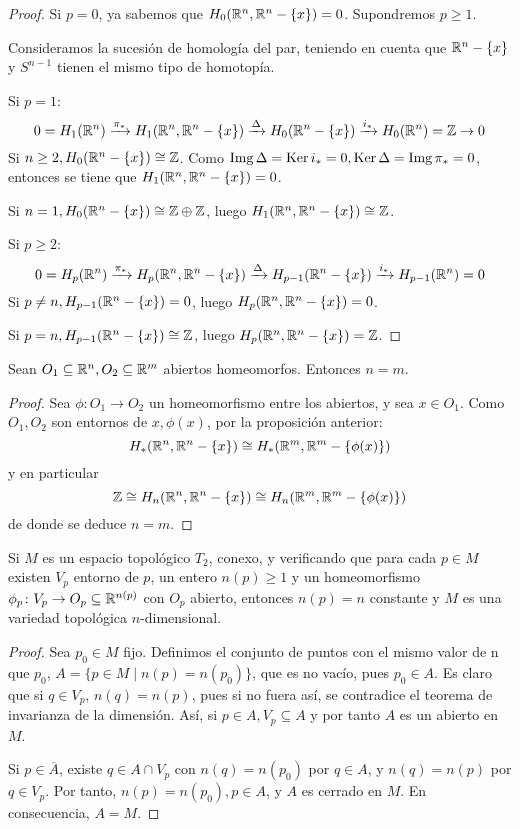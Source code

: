 \begin{proof}
  Si $p = 0$, ya sabemos que $H_0(\mathbb{R}^n, \mathbb{R}^n - \{x\}) = 0$. Supondremos $p \geq 1$.

  Consideramos la sucesión de homología del par, teniendo en cuenta que $\mathbb{R}^n - \{x\}$ y $S^{n-1}$ tienen el mismo tipo de homotopía.

  Si $p = 1$:
  \[ 0 = H_1(\mathbb{R}^n) \xrightarrow{\pi_*} H_1(\mathbb{R}^n, \mathbb{R}^n - \{x\}) \xrightarrow{\Delta} H_0(\mathbb{R}^n - \{x\}) \xrightarrow{i_*} H_0(\mathbb{R}^n) = \mathbb{Z} \to 0 \]
  Si $n \geq 2, H_0(\mathbb{R}^n - \{x\}) \cong \mathbb{Z}$. Como $\operatorname{Img} \Delta = \operatorname{Ker} i_* = 0, \operatorname{Ker} \Delta = \operatorname{Img} \pi_* = 0$, entonces se tiene que
  $H_1(\mathbb{R}^n, \mathbb{R}^n - \{x\}) = 0$.

  Si $n = 1, H_0(\mathbb{R}^n - \{x\}) \cong \mathbb{Z} \oplus \mathbb{Z}$, luego $H_1(\mathbb{R}^n, \mathbb{R}^n - \{x\}) \cong \mathbb{Z}$.

  Si $p \geq 2$:
  \[ 0 = H_p(\mathbb{R}^n) \xrightarrow{\pi_*} H_p(\mathbb{R}^n, \mathbb{R}^n - \{x\}) \xrightarrow{\Delta} H_{p-1}(\mathbb{R}^n - \{x\}) \xrightarrow{i_*} H_{p-1}(\mathbb{R}^n) = 0 \]
  Si $p \neq n, H_{p-1}(\mathbb{R}^n - \{x\}) = 0$, luego $H_p(\mathbb{R}^n, \mathbb{R}^n - \{x\}) = 0$.

  Si $p = n, H_{p-1}(\mathbb{R}^n - \{x\}) \cong \mathbb{Z}$, luego  $H_p(\mathbb{R}^n, \mathbb{R}^n - \{x\}) = \mathbb{Z}$.
\end{proof}

\begin{theorem}
  Sean $O_1 \subseteq \mathbb{R}^n, O_2 \subseteq \mathbb{R}^m$ abiertos homeomorfos. Entonces $n = m$.
\end{theorem}

\begin{proof}
  Sea $\phi \colon O_1 \to O_2$ un homeomorfismo entre los abiertos, y sea $x \in O_1$. Como $O_1, O_2$ son entornos de $x, \phi(x)$,
  por la proposición anterior:
  \[H_*(\mathbb{R}^n, \mathbb{R}^n - \{x\}) \cong H_*(\mathbb{R}^m, \mathbb{R}^m - \{\phi(x)\}) \]
  y en particular
  \[ \mathbb{Z} \cong H_n(\mathbb{R}^n, \mathbb{R}^n - \{x\}) \cong H_n(\mathbb{R}^m, \mathbb{R}^m - \{\phi(x)\}) \]
  de donde se deduce $n = m$.
\end{proof}

\begin{corollary}
  Si $M$ es un espacio topológico $T_2$, conexo, y verificando que para cada $p \in M$ existen $V_p$ entorno de $p$, un entero
  $n(p) \geq 1$ y un homeomorfismo $\phi_p \colon V_p \to O_p \subseteq \mathbb{R}^{n(p)}$ con $O_p$ abierto, entonces
  $n(p) = n$ constante y $M$ es una variedad topológica $n$-dimensional.
\end{corollary}

\begin{proof}
  Sea $p_0 \in M$ fijo. Definimos el conjunto de puntos con el mismo valor de n que $p_0$, $A = \{p \in M \mid n(p) = n(p_0)\}$,
  que es no vacío, pues $p_0 \in A$. Es claro que si $q \in V_p$, $n(q) = n(p)$, pues si no fuera así, se contradice el teorema
  de invarianza de la dimensión. Así, si $p \in A, V_p \subseteq A$ y por tanto $A$ es un abierto en $M$.

  Si $p \in \overline{A}$, existe $q \in A \cap V_p$ con $n(q) = n(p_0)$ por $q \in A$, y $n(q) = n(p)$ por $q \in V_p$.
  Por tanto, $n(p) = n(p_0), p \in A$, y $A$ es cerrado en $M$. En consecuencia, $A = M$.
\end{proof}

